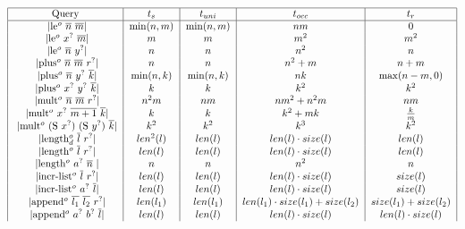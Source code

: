 \begin{figure}[t]
      \[ \begin{tabular}{|c|c|c|c|c|}
           \hline
           Query & $t_s$ & $t_{uni}$ & $t_{occ}$ & $t_r$  \\
           \hline
           \lstinline|le$^o$ $\overline{n}$ $\overline{m}$| & $\min(n, m)$ & $\min(n, m)$ & $nm$ & $0$  \\
           \lstinline|le$^o$ $x^?$ $\overline{m}$| & $m$ & $m$ & $m^2$ & $m^2$  \\
           \lstinline|le$^o$ $\overline{n}$ $y^?$| & $n$ & $n$ & $n^2$ & $n$  \\
           \lstinline|plus$^o$ $\overline{n}$ $\overline{m}$ $r^?$| & $n$ & $n$ & $n^2 + m$ & $n + m$  \\
           \lstinline|plus$^o$ $\overline{n}$ $y^?$ $\overline{k}$| & $\min(n, k)$ & $\min(n, k)$ & $nk$ & $\max(n - m, 0)$  \\
           \lstinline|plus$^o$ $x^?$ $y^?$ $\overline{k}$| & $k$ & $k$ & $k^2$ & $k^2$  \\
           \lstinline|mult$^o$ $\overline{n}$ $\overline{m}$ $r^?$| & $n^2 m$ & $n m$ & $n m^2 + n^2 m$ & $n m$  \\
           \lstinline|mult$^o$ $x^?$ $\overline{m + 1}$ $\overline{k}$| & $k$ & $k$ & $k^2 + mk$ & $\frac{k}{m}$  \\
           \lstinline|mult$^o$ (S $ x^?$) (S $y^?$) $\overline{k}$| & $k^2$ & $k^2$ & $k^3$ & $k^2$  \\
           \lstinline|length$_d^o$ $\overline{l}$ $r^?$| & $len^2(l)$ & $len(l)$ & $len(l) \cdot size(l)$ & $len(l)$  \\
           \lstinline|length$^o$ $\overline{l}$ $r^?$| & $len(l)$ & $len(l)$ & $len(l) \cdot size(l)$ & $len(l)$  \\
           \lstinline|length$^o$ $a^?$ $\overline{n}$ | & $n$ & $n$ & $n^2$ & $n$  \\
           \lstinline|incr-list$^o$ $\overline{l}$ $r^?$| & $len(l)$ & $len(l)$ & $len(l) \cdot size(l)$ & $size(l)$  \\
           \lstinline|incr-list$^o$ $a^?$ $\overline{l}$| & $len(l)$ & $len(l)$ & $len(l) \cdot size(l)$ & $size(l)$  \\
           \lstinline|append$^o$ $\overline{l_1}$ $\overline{l_2}$ $r^?$| & $len(l_1)$ & $len(l_1)$ & $len(l_1) \cdot size(l_1) + size(l_2)$ & $size(l_1) + size(l_2)$  \\
           \lstinline|append$^o$ $a^?$ $b^?$ $\overline{l}$| & $len(l)$ & $len(l)$ & $len(l) \cdot size(l)$ & $len(l) \cdot size(l)$  \\

\end{tabular}\]
\end{figure}
